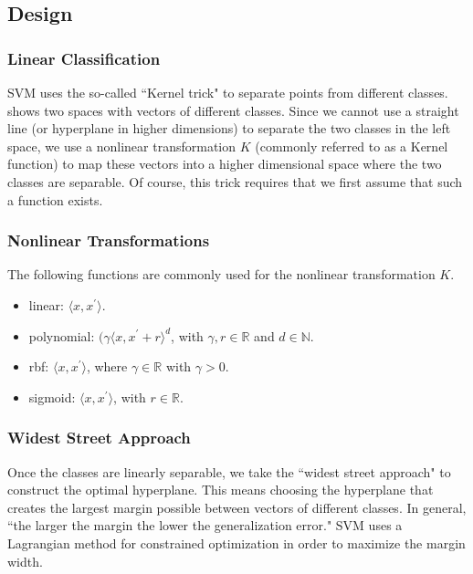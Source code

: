 \documentclass[10pt, titlepage]{amsart}
\newcommand\N{{\mathbb N}}
\newcommand\R{{\mathbb R}}
\theoremstyle{definition}
\begin{document}
	\subsection{Design}
		
	\subsubsection{Linear Classification}
	SVM uses the so-called ``Kernel trick" to separate points from different classes.
	 shows two spaces with vectors of different classes.
	Since we cannot use a straight line (or hyperplane in higher dimensions) to separate the two classes in the left space, we use a nonlinear transformation $K$ (commonly referred to as a Kernel function) to map these vectors into a higher dimensional space where the two classes are separable. Of course, this trick requires that we first assume that such a function exists.
	
	\subsubsection{Nonlinear Transformations}
	The following functions are commonly used for the nonlinear transformation $K$. \cite{scikit-learn}
	
	\begin{itemize}
		\item linear: $\langle x, x^\prime \rangle$.
		\item polynomial: $( \gamma \langle x, x^\prime + r \rangle^d$, with $\gamma, r \in \R$ and $d \in \N$.
		\item rbf: $\langle x, x^\prime \rangle$, where $\gamma \in \R$ with $\gamma > 0$.
		\item sigmoid: $\langle x, x^\prime \rangle$, with $r \in \R$.
	\end{itemize}

	\subsubsection{Widest Street Approach}
	Once the classes are linearly separable, we take the ``widest street approach" \cite{mit} to construct the optimal hyperplane.
	This means choosing the hyperplane that creates the largest margin possible between vectors of different classes.
	In general, ``the larger the margin the lower the generalization error." \cite{scikit-learn}
	SVM uses a Lagrangian method for constrained optimization in order to maximize the margin width.
	
\end{document}
